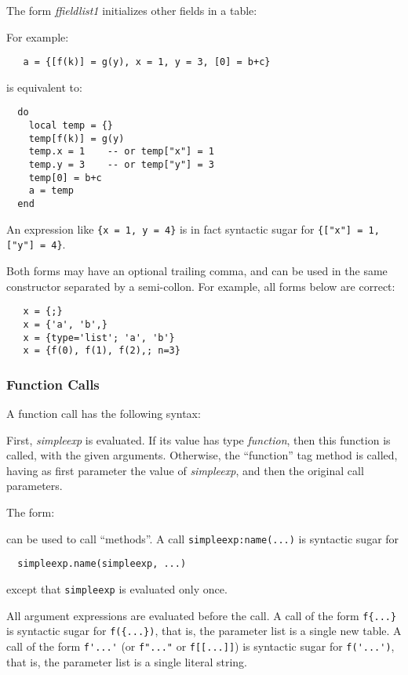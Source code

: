 \documentclass[11pt]{article}
\newcommand{\M}[1]{\emph{#1}}
\newcommand{\Index}[1]{#1\index{#1}}
\begin{document}
The form \emph{ffieldlist1} initializes other fields in a table:
\begin{Produc}
\end{Produc}%
For example:
\begin{verbatim}
   a = {[f(k)] = g(y), x = 1, y = 3, [0] = b+c}
\end{verbatim}
is equivalent to:
\begin{verbatim}
  do
    local temp = {}
    temp[f(k)] = g(y)
    temp.x = 1    -- or temp["x"] = 1
    temp.y = 3    -- or temp["y"] = 3
    temp[0] = b+c
    a = temp
  end
\end{verbatim}
An expression like \verb|{x = 1, y = 4}| is
in fact syntactic sugar for \verb|{["x"] = 1, ["y"] = 4}|.

Both forms may have an optional trailing comma,
and can be used in the same constructor separated by
a semi-collon.
For example, all forms below are correct:
\begin{verbatim}
   x = {;}
   x = {'a', 'b',}
   x = {type='list'; 'a', 'b'}
   x = {f(0), f(1), f(2),; n=3}
\end{verbatim}

\subsubsection{Function Calls}  \label{functioncall}
A \Index{function call} has the following syntax:
\begin{Produc}
\end{Produc}%
First, \M{simpleexp} is evaluated.
If its value has type \emph{function},
then this function is called,
with the given arguments.
Otherwise, the ``function'' tag method is called,
having as first parameter the value of \M{simpleexp},
and then the original call parameters.

The form:
\begin{Produc}
\end{Produc}%
can be used to call ``methods''.
A call \verb|simpleexp:name(...)|
is syntactic sugar for
\begin{verbatim}
  simpleexp.name(simpleexp, ...)
\end{verbatim}
except that \verb|simpleexp| is evaluated only once.

\begin{Produc}
\end{Produc}%
All argument expressions are evaluated before the call.
A call of the form \verb|f{...}| is syntactic sugar for
\verb|f({...})|, that is,
the parameter list is a single new table.
A call of the form \verb|f'...'|
(or \verb|f"..."| or \verb|f[[...]]|) is syntactic sugar for
\verb|f('...')|, that is,
the parameter list is a single literal string.
\end{document}
